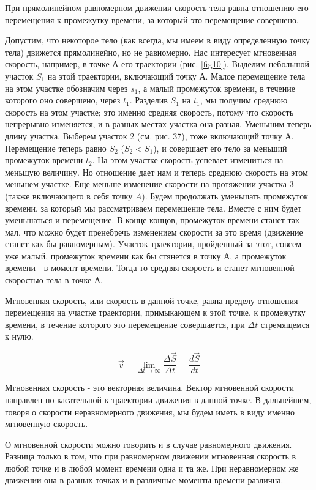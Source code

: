 \documentclass[a6paper, 11pt]{diss_4}
\renewcommand{\'}{\,'}
\begin{document}
  При прямолинейном равномерном движении скорость тела равна отношению
его перемещения к промежутку времени, за который это перемещение совершено.

  Допустим, что некоторое тело (как всегда, мы имеем в виду определенную
точку тела) движется прямолинейно, но не равномерно. Нас интересует мгновенная
 скорость, например, в точке $А$ его траектории (рис. \ref{fig10}). Выделим небольшой
участок $S_1$ на этой траектории, включающий точку $А$. Малое перемещение тела
на этом участке обозначим через $s_1$, а малый промежуток времени, в течение
которого оно совершено, через $t_1$. Разделив $S_1$ на $t_1$, мы получим
среднюю скорость на этом участке; это именно средняя скорость, потому что
скорость непрерывно изменяется, и в разных местах участка она разная.
Уменьшим теперь длину участка. Выберем участок 2 (см. рис. 37), тоже
включающий точку $А$. Перемещение теперь равно $S_2$ ($S_2<S_1$), и совершает
его тело за меньший промежуток времени $t_2$. На этом участке скорость
успевает измениться на меньшую величину. Но отношение дает нам и теперь
среднюю скорость на этом меньшем участке. Еще меньше изменение скорости на
протяжении участка 3 (также включающего в себя точку $A$). Будем продолжать
уменьшать промежуток времени, за который мы рассматриваем перемещение тела.
Вместе с ним будет уменьшаться и перемещение. В конце концов, промежуток
времени станет так мал, что можно будет пренебречь изменением скорости за это
время (движение станет как бы равномерным). Участок траектории, пройденный за
этот, совсем уже малый, промежуток времени как бы стянется в точку $А$, а
промежуток времени - в момент времени. Тогда-то средняя скорость и станет
мгновенной скоростью тела в точке $А$.

  Мгновенная скорость, или скорость в данной точке, равна пределу
отношения перемещения на участке траектории, примыкающем к этой точке, к
промежутку времени, в течение которого это перемещение совершается, при
$\Delta t$ стремящемся к нулю.

\[\vec{v}=\lim_{\Delta t\to\infty}\frac{\Delta\vec{S}}{\Delta t}=
\frac{d\vec{S}}{dt}
\]

  Мгновенная скорость - это векторная величина. Вектор мгновенной
скорости направлен по касательной к траектории движения в данной точке. В
дальнейшем, говоря о скорости неравномерного движения, мы будем иметь в виду
именно мгновенную скорость.

  О мгновенной скорости можно говорить и в случае равномерного движения.
Разница только в том, что при равномерном движении мгновенная скорость в любой
точке и в любой момент времени одна и та же. При неравномерном же движении она
в разных точках и в различные моменты времени различна.
\end{document}
